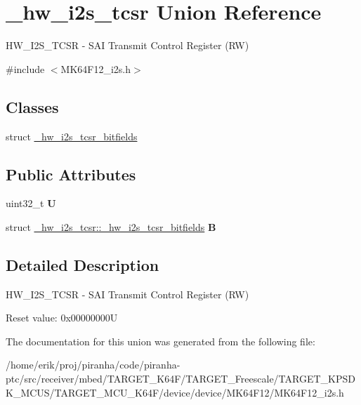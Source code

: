 \hypertarget{union__hw__i2s__tcsr}{}\section{\+\_\+hw\+\_\+i2s\+\_\+tcsr Union Reference}
\label{union__hw__i2s__tcsr}


H\+W\+\_\+\+I2\+S\+\_\+\+T\+C\+SR -\/ S\+AI Transmit Control Register (RW)  




{\ttfamily \#include $<$M\+K64\+F12\+\_\+i2s.\+h$>$}

\subsection*{Classes}
\begin{DoxyCompactItemize}
\item 
struct \hyperlink{struct__hw__i2s__tcsr_1_1__hw__i2s__tcsr__bitfields}{\+\_\+hw\+\_\+i2s\+\_\+tcsr\+\_\+bitfields}
\end{DoxyCompactItemize}
\subsection*{Public Attributes}
\begin{DoxyCompactItemize}
\item 
uint32\+\_\+t {\bfseries U}\hypertarget{union__hw__i2s__tcsr_a5f7022095bf318957281a7c5309e14cd}{}\label{union__hw__i2s__tcsr_a5f7022095bf318957281a7c5309e14cd}

\item 
struct \hyperlink{struct__hw__i2s__tcsr_1_1__hw__i2s__tcsr__bitfields}{\+\_\+hw\+\_\+i2s\+\_\+tcsr\+::\+\_\+hw\+\_\+i2s\+\_\+tcsr\+\_\+bitfields} {\bfseries B}\hypertarget{union__hw__i2s__tcsr_a7d198e9cee18d29ac9382b992b3e3e0b}{}\label{union__hw__i2s__tcsr_a7d198e9cee18d29ac9382b992b3e3e0b}

\end{DoxyCompactItemize}


\subsection{Detailed Description}
H\+W\+\_\+\+I2\+S\+\_\+\+T\+C\+SR -\/ S\+AI Transmit Control Register (RW) 

Reset value\+: 0x00000000U 

The documentation for this union was generated from the following file\+:\begin{DoxyCompactItemize}
\item 
/home/erik/proj/piranha/code/piranha-\/ptc/src/receiver/mbed/\+T\+A\+R\+G\+E\+T\+\_\+\+K64\+F/\+T\+A\+R\+G\+E\+T\+\_\+\+Freescale/\+T\+A\+R\+G\+E\+T\+\_\+\+K\+P\+S\+D\+K\+\_\+\+M\+C\+U\+S/\+T\+A\+R\+G\+E\+T\+\_\+\+M\+C\+U\+\_\+\+K64\+F/device/device/\+M\+K64\+F12/M\+K64\+F12\+\_\+i2s.\+h\end{DoxyCompactItemize}
